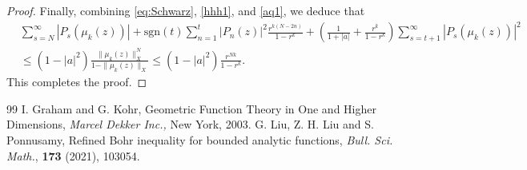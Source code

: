 \documentclass[10pt,a4paper]{amsart}
\begin{document}
\begin{proof}
Finally, combining \eqref{eq:Schwarz}, \eqref{hhh1}, and \eqref{aq1}, we deduce that
\begin{align*}
&\sum_{s=N}^{\infty}|P_s(\mu_k(z))|
+\text{sgn}(t)\sum_{n=1}^t|P_n(z)|^2\frac{r^{k(N-2n)}}{1-r^k}
+\left(\frac{1}{1+|a|}
+\frac{r^k}{1-r^k}\right)
\sum_{s=t+1}^{\infty}|P_s(\mu_k(z))|^2
\\
&\le
(1-|a|^2)
\frac{\|\mu_k(z)\|_X^N}
     {1-\|\mu_k(z)\|_X}
\le
(1-|a|^2)\frac{r^{Nk}}{1-r^k}.
\end{align*}
This completes the proof.
\end{proof}

\begin{thebibliography}{99}
 {\sc I. Graham and G. Kohr}, Geometric Function Theory in One and Higher Dimensions, \textit{Marcel Dekker Inc.,} New York, 2003.
 {\sc G. Liu, Z. H. Liu and S. Ponnusamy}, Refined Bohr inequality for bounded analytic functions, \textit{Bull. Sci. Math.}, \textbf{173} (2021), 103054.
\end{thebibliography}
\end{document}
